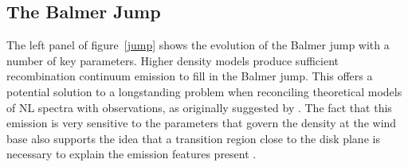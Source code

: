 \documentclass[preprint, a4paper, 11pt]{aastex}
\begin{document}
\subsection{The Balmer Jump}

\label{balmerjump}

The left panel of figure~\ref{jump} shows the evolution
of the Balmer jump with a number of key parameters. Higher density models
produce sufficient recombination continuum emission to fill 
in the Balmer jump. This offers a potential solution to a 
longstanding problem when reconciling theoretical
models of NL spectra with observations, as originally suggested by
\cite{KLWB98}. The fact that this emission is very sensitive to the parameters
that govern the density at the wind base also supports
the idea that a transition region close to the disk plane is necessary
to explain the emission features present \citep{kd1997}.



\end{document}
